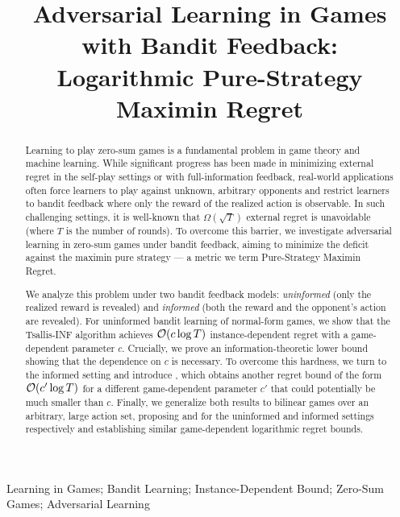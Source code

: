 \documentclass[cleveref,12pt,noabbrev,capitalize]{jmlrXiv} %
\title[Adversarial Learning in Games with Bandit Feedback]{Adversarial Learning in Games with Bandit Feedback: \\ Logarithmic Pure-Strategy Maximin Regret}
\begin{document}
\maketitle
\ifanonsubmission\else
{}
\fi

\begin{abstract}%
Learning to play zero-sum games %
is a fundamental problem in game theory and machine learning.
While significant progress has been made in minimizing external regret in the self-play settings or with full-information feedback,
real-world applications often force learners to play against unknown, arbitrary opponents
and restrict learners to bandit feedback where only the reward of the realized action is observable.
In such challenging settings, it is well-known that $\Omega(\sqrt T)$ external regret is unavoidable (where $T$ is the number of rounds).
To overcome this barrier, we investigate
adversarial learning in zero-sum games under bandit feedback,
aiming to minimize the deficit against the maximin pure strategy --- a metric we term Pure-Strategy Maximin Regret.

We analyze this problem under two bandit feedback models:
\emph{uninformed} (only the realized reward is revealed)
and
\emph{informed} (both the reward and the opponent's action are revealed).
For uninformed bandit learning of normal-form games,
we show that the Tsallis-INF algorithm achieves
$\mathcal{O}(c \log T)$ instance-dependent regret
with a game-dependent parameter $c$.
Crucially, we prove an information-theoretic lower bound showing that
the dependence on $c$ is necessary.
To overcome this hardness,
we turn to the informed setting and introduce \PureUCB{}, which obtains another regret bound of the form $\mathcal{O}(c' \log T)$ for a different game-dependent parameter $c'$ that could potentially be much smaller than $c$. 
Finally, we generalize both results to bilinear games over an arbitrary, large action set,
proposing \TsallisSPM{} and \PureLinUCB{} for the uninformed and informed settings respectively
and establishing similar game-dependent logarithmic regret bounds.
\end{abstract}

\begin{keywords}%
  Learning in Games; Bandit Learning; Instance-Dependent Bound; Zero-Sum Games; Adversarial Learning
\end{keywords}












\newpage
\appendix
{} %







\end{document}
